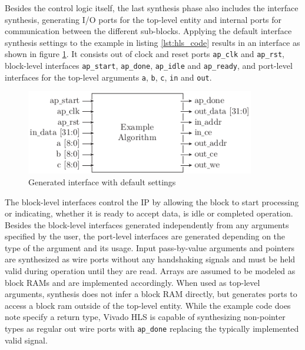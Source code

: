 Besides the control logic itself, the last synthesis phase also includes the
interface synthesis, generating I/O ports for the top-level entity and
internal ports for communication between the different sub-blocks. Applying
the default interface synthesis settings to the example in listing
\ref{lst:hls_code} results in an interface as shown in figure
\ref{fig:hls_if}. It consists out of clock and reset ports
\lstinline{ap_clk} and \lstinline{ap_rst}, block-level interfaces
\lstinline{ap_start}, \lstinline{ap_done}, \lstinline{ap_idle} and
\lstinline{ap_ready}, and port-level interfaces for the top-level arguments
\lstinline{a}, \lstinline{b}, \lstinline{c}, \lstinline{in} and
\lstinline{out}.
\begin{figure}[tb]
	\centering
	\includegraphics[width=10cm]{../figures/hls_if}
	\caption{Generated interface with default settings}
	\label{fig:hls_if}
\end{figure}
The block-level interfaces control the \ac{IP} by allowing the block to start
processing or indicating, whether it is ready to accept data, is idle or
completed operation. Besides the block-level interfaces generated
independently from any arguments specified by the user, the port-level
interfaces are generated depending on the type of the argument and its usage.
Input pass-by-value arguments and pointers are synthesized as wire ports
without any handshaking signals and must be held valid during operation until
they are read. Arrays are assumed to be modeled as block \acp{RAM} and are
implemented accordingly. When used as top-level arguments, synthesis does not
infer a block \ac{RAM} directly, but generates ports to access a block ram
outside of the top-level entity. While the example code does note specify a
return type, Vivado HLS is capable of synthesizing non-pointer types as
regular out wire ports with \lstinline{ap_done} replacing the typically
implemented valid signal.

